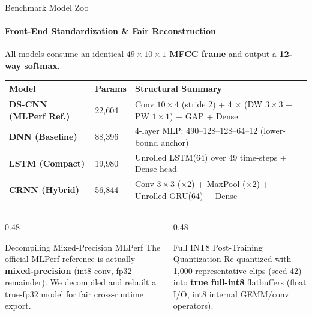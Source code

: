 \documentclass[aspectratio=169]{beamer}
\begin{document}
\begin{frame}{Benchmark Model Zoo}
\framesubtitle{Front-End Standardization \& Fair Reconstruction}
All models consume an identical \textbf{$49 \times 10 \times 1$ MFCC frame} and output a \textbf{12-way softmax}.

\vspace{0.1em}
\begin{table}[h]
\centering
\scriptsize
\setlength{\tabcolsep}{4pt}
\begin{tabular}{llp{9.0cm}}
\toprule
\textbf{Model} & \textbf{Params} & \textbf{Structural Summary} \\
\midrule
\textbf{DS-CNN (MLPerf Ref.)} & 22,604 & Conv $10\times4$ (stride 2) + 4 $\times$ (DW $3\times3$ + PW $1\times1$) + GAP + Dense \\
\textbf{DNN (Baseline)}        & 88,396 & 4-layer MLP: 490--128--128--64--12 (lower-bound anchor) \\
\textbf{LSTM (Compact)}        & 19,980 & Unrolled LSTM(64) over 49 time-steps + Dense head \\
\textbf{CRNN (Hybrid)}         & 56,844 & Conv $3\times3$ ($\times2$) + MaxPool ($\times2$) + Unrolled GRU(64) + Dense \\
\bottomrule
\end{tabular}
\end{table}

\begin{columns}[T]
  \begin{column}{0.48\textwidth}
    \begin{block}{Decompiling Mixed-Precision MLPerf}
      \small The official MLPerf reference is actually \textbf{mixed-precision} (int8 conv, fp32 remainder). We decompiled and rebuilt a true-fp32 model for fair cross-runtime export.
    \end{block}
  \end{column}
  \begin{column}{0.48\textwidth}
    \begin{exampleblock}{Full INT8 Post-Training Quantization}
      \small Re-quantized with 1,000 representative clips (seed 42) into \textbf{true full-int8} flatbuffers (float I/O, int8 internal GEMM/conv operators).
    \end{exampleblock}
  \end{column}
\end{columns}
\end{frame}
\end{document}
